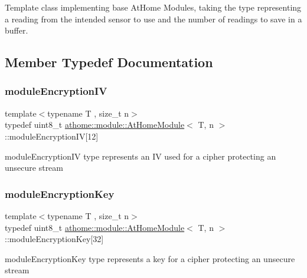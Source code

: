 Template class implementing base At\+Home Modules, taking the type representing a reading from the intended sensor to use and the number of readings to save in a buffer. 

\subsection{Member Typedef Documentation}
\mbox{\label{classathome_1_1module_1_1_at_home_module_a75cae8d69276f23834dda9b23da17707}} 
\subsubsection{\texorpdfstring{module\+Encryption\+IV}{moduleEncryptionIV}}
{\footnotesize\ttfamily template$<$typename T , size\+\_\+t n$>$ \\
typedef uint8\+\_\+t \mbox{\hyperlink{classathome_1_1module_1_1_at_home_module}{athome\+::module\+::\+At\+Home\+Module}}$<$ T, n $>$\+::module\+Encryption\+IV\mbox{[}12\mbox{]}}

{\ttfamily module\+Encryption\+IV} type represents an IV used for a cipher protecting an unsecure stream \mbox{\label{classathome_1_1module_1_1_at_home_module_adcc0f673f2ccb3e3f3619fda97adadcf}} 
\subsubsection{\texorpdfstring{module\+Encryption\+Key}{moduleEncryptionKey}}
{\footnotesize\ttfamily template$<$typename T , size\+\_\+t n$>$ \\
typedef uint8\+\_\+t \mbox{\hyperlink{classathome_1_1module_1_1_at_home_module}{athome\+::module\+::\+At\+Home\+Module}}$<$ T, n $>$\+::module\+Encryption\+Key\mbox{[}32\mbox{]}}

{\ttfamily module\+Encryption\+Key} type represents a key for a cipher protecting an unsecure stream \mbox{\label{classathome_1_1module_1_1_at_home_module_a628bd00cf83073b87c41a3ce2b362a9c}} 
